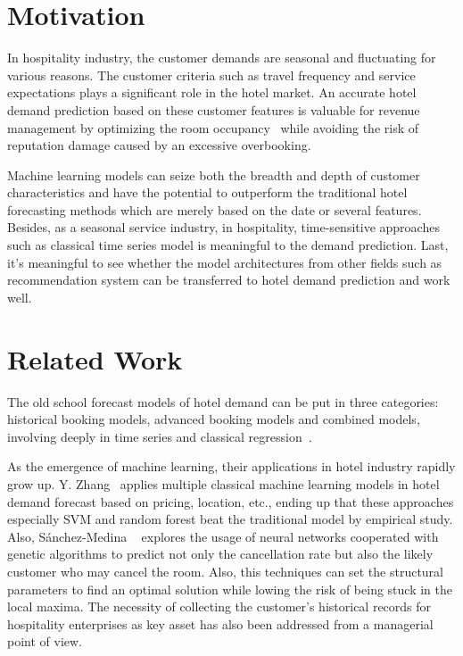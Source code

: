 \documentclass[10pt,twocolumn,letterpaper]{article}
\begin{document}
\section{Motivation}
In hospitality industry, the customer demands are seasonal and fluctuating for various reasons. The customer criteria such as travel frequency and service expectations plays a significant role in the hotel market. An accurate hotel demand prediction based on these customer features is valuable for revenue management by optimizing the room occupancy~\cite{weatherford2003comparison} while avoiding the risk of reputation damage caused by an excessive overbooking.

Machine learning models can seize both the breadth and depth of customer characteristics and have the potential to outperform the traditional hotel forecasting methods which are merely based on the date or several features. Besides, as a seasonal service industry, in hospitality, time-sensitive approaches such as classical time series model is meaningful to the demand prediction. Last, it's meaningful to see whether the model architectures from other fields such as recommendation system can be transferred to hotel demand prediction and work well.


\section{Related Work}
The old school forecast models of hotel demand can be put in three categories: historical booking models, advanced booking models and combined models, involving deeply in time series and classical regression~\cite{weatherford2003comparison}.

As the emergence of machine learning, their applications in hotel industry rapidly grow up. Y. Zhang~\cite{ZhangApproaches} applies multiple classical machine learning models in hotel demand forecast based on pricing, location, etc., ending up that these approaches especially SVM and random forest beat the traditional model by empirical study. Also, S{\'a}nchez-Medina \etal~\cite{sanchez2020using} explores the usage of neural networks cooperated with genetic algorithms to predict not only the cancellation rate but also the likely customer who may cancel the room. Also, this techniques can set the structural parameters to find an optimal solution while lowing the risk of being stuck in the local maxima. The necessity of collecting the customer's historical records for hospitality enterprises as key asset has also been addressed from a managerial point of view.
\end{document}
